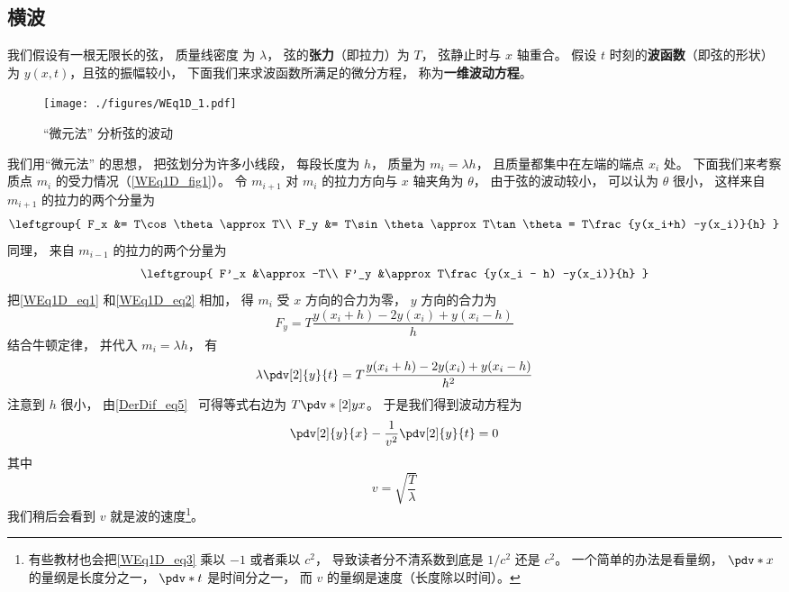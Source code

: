 

\subsection{横波}
我们假设有一根无限长的弦， 质量线密度%
为 $\lambda$， 弦的\textbf{张力}（即拉力）为 $T$， 弦静止时与 $x$ 轴重合。 假设 $t$ 时刻的\textbf{波函数}（即弦的形状）为 $y(x, t)$，且弦的振幅较小， 下面我们来求波函数所满足的微分方程， 称为\textbf{一维波动方程}。

\begin{figure}[ht]
\centering
\texttt{[image: ./figures/WEq1D\_1.pdf]}
\caption{“微元法” 分析弦的波动} \label{WEq1D_fig1}
\end{figure}

我们用“微元法” 的思想， 把弦划分为许多小线段， 每段长度为 $h$， 质量为 $m_i = \lambda h$， 且质量都集中在左端的端点 $x_i$ 处。 下面我们来考察质点 $m_i$ 的受力情况（\autoref{WEq1D_fig1}）。 令 $m_{i+1}$ 对 $m_i$ 的拉力方向与 $x$ 轴夹角为 $\theta$， 由于弦的波动较小， 可以认为 $\theta$ 很小， 这样来自 $m_{i+1}$ 的拉力的两个分量为
\begin{equation}\label{WEq1D_eq1}
\leftgroup{
F_x &= T\cos\theta \approx T\\
F_y &= T\sin\theta \approx T\tan\theta = T\frac{y(x_i+h) -y(x_i)}{h}
}\end{equation}
同理， 来自 $m_{i-1}$ 的拉力的两个分量为
\begin{equation}\label{WEq1D_eq2}
\leftgroup{
F'_x &\approx -T\\
F'_y &\approx T\frac{y(x_i - h) -y(x_i)}{h}
}\end{equation}
把\autoref{WEq1D_eq1} 和\autoref{WEq1D_eq2} 相加， 得 $m_i$ 受 $x$ 方向的合力为零， $y$ 方向的合力为
\begin{equation}
F_y = T\frac{y(x_i+h) - 2y(x_i) + y(x_i-h)}{h}
\end{equation}
结合牛顿定律， 并代入 $m_i = \lambda h$， 有
\begin{equation}
\lambda \pdv[2]{y}{t} = T\frac{y(x_i+h) - 2y(x_i) + y(x_i-h)}{h^2}
\end{equation}
注意到 $h$ 很小， 由\autoref{DerDif_eq5}~ 可得等式右边为 $T\pdv*[2]{y}{x}$。 于是我们得到波动方程为
\begin{equation}\label{WEq1D_eq3}
\pdv[2]{y}{x} - \frac{1}{v^2}\pdv[2]{y}{t} = 0
\end{equation}
其中
\begin{equation}
v = \sqrt{\frac{T}{\lambda}}
\end{equation}
我们稍后会看到 $v$ 就是波的速度\footnote{有些教材也会把\autoref{WEq1D_eq3} 乘以 $-1$ 或者乘以 $c^2$， 导致读者分不清系数到底是 $1/c^2$ 还是 $c^2$。 一个简单的办法是看量纲， $\pdv*{x}$ 的量纲是长度分之一， $\pdv*{t}$ 是时间分之一， 而 $v$ 的量纲是速度（长度除以时间）。}。


